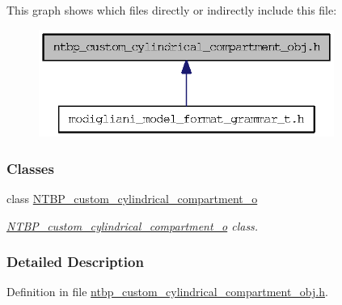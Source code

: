 This graph shows which files directly or indirectly include this file:
\nopagebreak
\begin{figure}[H]
\begin{center}
\leavevmode
\includegraphics[width=274pt]{ntbp__custom__cylindrical__compartment__obj_8h__dep__incl}
\end{center}
\end{figure}
\subsubsection*{Classes}
\begin{DoxyCompactItemize}
\item 
class \hyperlink{class_n_t_b_p__custom__cylindrical__compartment__o}{NTBP\_\-custom\_\-cylindrical\_\-compartment\_\-o}
\begin{DoxyCompactList}\small\item\em \hyperlink{class_n_t_b_p__custom__cylindrical__compartment__o}{NTBP\_\-custom\_\-cylindrical\_\-compartment\_\-o} class. \item\end{DoxyCompactList}\end{DoxyCompactItemize}


\subsubsection{Detailed Description}


Definition in file \hyperlink{ntbp__custom__cylindrical__compartment__obj_8h_source}{ntbp\_\-custom\_\-cylindrical\_\-compartment\_\-obj.h}.

